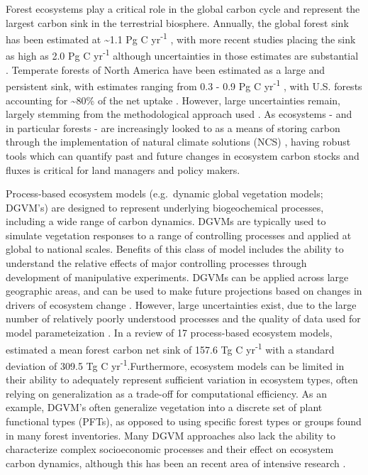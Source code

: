 \documentclass[
]{book}
\begin{document}
Forest ecosystems play a critical role in the global carbon cycle and represent the largest carbon sink in the terrestrial biosphere. Annually, the global forest sink has been estimated at \textasciitilde1.1 Pg C yr\textsuperscript{-1} \citep{pan2011large}, with more recent studies placing the sink as high as 2.0 Pg C yr\textsuperscript{-1} although uncertainties in those estimates are substantial \citep{harris2021global}. Temperate forests of North America have been estimated as a large and persistent sink, with estimates ranging from 0.3 - 0.9 Pg C yr\textsuperscript{-1} \citep{hayes2012reconciling}, with U.S. forests accounting for \textasciitilde80\% of the net uptake \citep{usgcrp2018soccr2}. However, large uncertainties remain, largely stemming from the methodological approach used \citep{hayes2012reconciling}. As ecosystems - and in particular forests - are increasingly looked to as a means of storing carbon through the implementation of natural climate solutions (NCS) \citep{fargione2018natural, griscom2017natural, cameron2017ecosystem}, having robust tools which can quantify past and future changes in ecosystem carbon stocks and fluxes is critical for land managers and policy makers.

Process-based ecosystem models (e.g.~dynamic global vegetation models; DGVM's) are designed to represent underlying biogeochemical processes, including a wide range of carbon dynamics. DGVMs are typically used to simulate vegetation responses to a range of controlling processes and applied at global to national scales. Benefits of this class of model includes the ability to understand the relative effects of major controlling processes through development of manipulative experiments. DGVMs can be applied across large geographic areas, and can be used to make future projections based on changes in drivers of ecosystem change \citep{huntzinger2012north}. However, large uncertainties exist, due to the large number of relatively poorly understood processes and the quality of data used for model parameteization \citep{hayes2012reconciling, huntzinger2012north}. In a review of 17 process-based ecosystem models, \citet{hayes2012reconciling} estimated a mean forest carbon net sink of 157.6 Tg C yr\textsuperscript{-1} with a standard deviation of 309.5 Tg C yr\textsuperscript{-1}.Furthermore, ecosystem models can be limited in their ability to adequately represent sufficient variation in ecosystem types, often relying on generalization as a trade-off for computational efficiency. As an example, DGVM's often generalize vegetation into a discrete set of plant functional types (PFTs), as opposed to using specific forest types or groups found in many forest inventories. Many DGVM approaches also lack the ability to characterize complex socioeconomic processes and their effect on ecosystem carbon dynamics, although this has been an recent area of intensive research \citep{bachelet2015projected, liu2020critical}.
\end{document}
